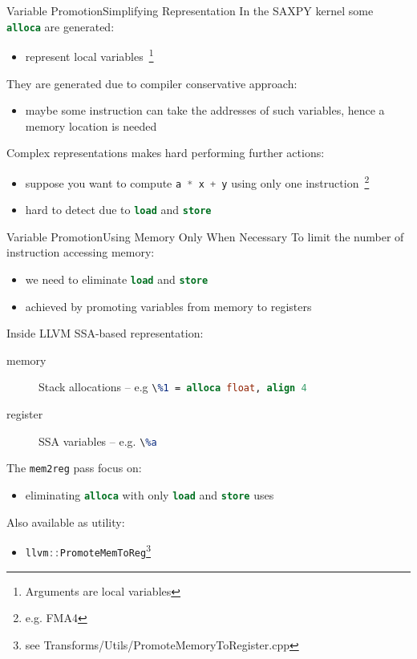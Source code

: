 \documentclass[10pt,mathserif]{beamer}
\newcommand{\cinline}[1]{\lstinline[language=C]!#1!}
\newcommand{\cppinline}[1]{\lstinline[language=C++]!#1!}
\newcommand{\llvminline}[1]{\lstinline[language=LLVM]!#1!}
\begin{document}
\begin{frame}{Variable Promotion}{Simplifying Representation}
In the SAXPY kernel some \llvminline{alloca} are generated:

\begin{itemize}
\item represent \alert{local variables}~\footnote{Arguments are local variables}
\end{itemize}

They are generated due to compiler \alert{conservative} approach:

\begin{itemize}
\item maybe some instruction can take the addresses of such variables, hence a
      memory location is needed
\end{itemize}

Complex representations makes hard performing further actions:

\begin{itemize}
\item suppose you want to compute \cinline{a * x + y} using only one
      instruction~\footnote{e.g. FMA4}
\item hard to detect due to \llvminline{load} and \llvminline{store}
\end{itemize}
\end{frame}

\begin{frame}{Variable Promotion}{Using Memory Only When Necessary}
To limit the number of instruction accessing memory:

\begin{itemize}
\item we need to eliminate \llvminline{load} and \llvminline{store}
\item achieved by \alert{promoting} variables from memory to registers
\end{itemize}

Inside LLVM SSA-based representation:

\begin{description}
\item[memory] Stack allocations --
              e.g \llvminline{\%1 = alloca float, align 4}
\item[register] SSA variables -- e.g. \llvminline{\%a}
\end{description}

The \texttt{mem2reg} pass focus on:

\begin{itemize}
\item eliminating \llvminline{alloca} with only \llvminline{load} and
      \llvminline{store} uses
\end{itemize}

Also available as utility:

\begin{itemize}
\item \cppinline{llvm::PromoteMemToReg}\footnote{see Transforms/Utils/PromoteMemoryToRegister.cpp}
\end{itemize}
\end{frame}
\end{document}
